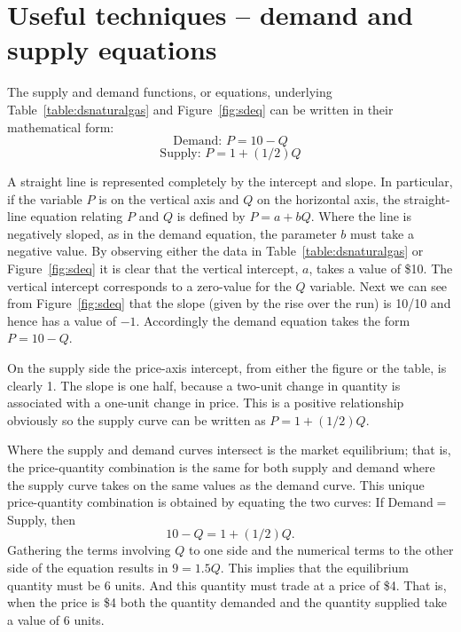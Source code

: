 \newpage
\section{Useful techniques -- demand and supply equations}\label{sec:ch3sec9}

The supply and demand functions, or equations, underlying Table~\ref{table:dsnaturalgas}
and Figure~\ref{fig:sdeq} can be written in their mathematical form:
\begin{equation*}
\text{Demand: }P=10-Q 
\end{equation*}
\begin{equation*}
\text{Supply: }P=1+(1/2)Q 
\end{equation*}

A straight line is represented completely by the intercept and slope. In
particular, if the variable $P$ is on the vertical axis and $Q$ on the
horizontal axis, the straight-line equation relating $P$ and $Q$ is defined
by $P=a+bQ$. Where the line is negatively sloped, as in the demand equation,
the parameter $b$ must take a negative value. By observing either the data in
Table~\ref{table:dsnaturalgas} or Figure~\ref{fig:sdeq} it is clear that the
vertical intercept, $a$, takes a value of \$10. The vertical intercept
corresponds to a zero-value for the $Q$ variable. Next we can see from
Figure~\ref{fig:sdeq} that the slope (given by the rise over the run) is 10/10
and hence has a value of $-1$. Accordingly the demand equation takes the form
$P=10-Q$.

On the supply side the price-axis intercept, from either the figure or the
table, is clearly 1. The slope is one half, because a two-unit change in
quantity is associated with a one-unit change in price. This is a positive
relationship obviously so the supply curve can be written as $P=1+(1/2)Q$.

Where the supply and demand curves intersect is the market equilibrium; that
is, the price-quantity combination is the same for both supply and demand
where the supply curve takes on the same values as the demand curve. This
unique price-quantity combination is obtained by equating the two curves: If
Demand$=$Supply, then
\begin{equation*}
10-Q=1+(1/2)Q. 
\end{equation*}
Gathering the terms involving $Q$ to one side and the numerical terms to the
other side of the equation results in $9=1.5Q.$ This implies that the
equilibrium quantity must be 6 units. And this quantity must trade at a
price of \$4. That is, when the price is \$4 both the quantity demanded
and the quantity supplied take a value of 6 units.

